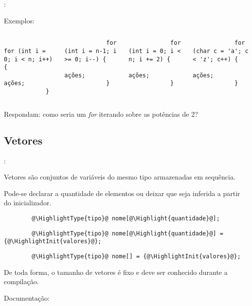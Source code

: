 \begin{frame}[fragile]{\insertsection: \insertsubsection}

	Exemplos:
	\begin{columns}
		\begin{verbatim}
			for (int i = 0; i < n; i++) {
				ações;
			}
		\end{verbatim}
		\begin{verbatim}
			for (int i = n-1; i >= 0; i--) {
				ações;
			}
		\end{verbatim}

		\begin{verbatim}
			for (int i = 0; i < n; i += 2) {
				ações;
			}
		\end{verbatim}
		\begin{verbatim}
			for (char c = 'a'; c < 'z'; c++) {
				ações;
			}
		\end{verbatim}
	\end{columns}

	\vfill
	Respondam: como seria um \emph{for} iterando sobre as potências de 2?

\end{frame}


\subsection{Vetores}


\begin{frame}[b,fragile]{\insertsection: \insertsubsection}

	Vetores são conjuntos de variáveis do mesmo tipo armazenadas em sequência.

	\bigskip
	Pode-se declarar a quantidade de elementos ou deixar que seja inferida a partir do inicializador.

	\begin{verbatim}
		@\HighlightType{tipo}@ nome[@\Highlight{quantidade}@];
	\end{verbatim}

	\begin{verbatim}
		@\HighlightType{tipo}@ nome[@\Highlight{quantidade}@] = {@\HighlightInit{valores}@};
	\end{verbatim}

	\begin{verbatim}
		@\HighlightType{tipo}@ nome[] = {@\HighlightInit{valores}@};
	\end{verbatim}

	De toda forma, o tamanho de vetores é fixo e deve ser conhecido durante a compilação.

	\vfill
	Documentação: 

\end{frame}


